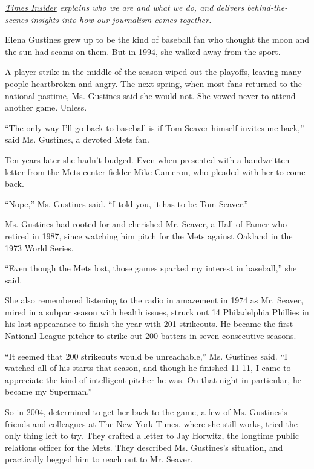 \href{https://www.nytimes3xbfgragh.onion/series/times-insider}{\emph{Times
Insider}} \emph{explains who we are and what we do, and delivers
behind-the-scenes insights into how our journalism comes together.}

Elena Gustines grew up to be the kind of baseball fan who thought the
moon and the sun had seams on them. But in 1994, she walked away from
the sport.

A player strike in the middle of the season wiped out the playoffs,
leaving many people heartbroken and angry. The next spring, when most
fans returned to the national pastime, Ms. Gustines said she would not.
She vowed never to attend another game. Unless.

``The only way I'll go back to baseball is if Tom Seaver himself invites
me back,'' said Ms. Gustines, a devoted Mets fan.

Ten years later she hadn't budged. Even when presented with a
handwritten letter from the Mets center fielder Mike Cameron, who
pleaded with her to come back.

``Nope,'' Ms. Gustines said. ``I told you, it has to be Tom Seaver.''

Ms. Gustines had rooted for and cherished Mr. Seaver, a Hall of Famer
who retired in 1987, since watching him pitch for the Mets against
Oakland in the 1973 World Series.

``Even though the Mets lost, those games sparked my interest in
baseball,'' she said.

She also remembered listening to the radio in amazement in 1974 as Mr.
Seaver, mired in a subpar season with health issues, struck out 14
Philadelphia Phillies in his last appearance to finish the year with 201
strikeouts. He became the first National League pitcher to strike out
200 batters in seven consecutive seasons.

``It seemed that 200 strikeouts would be unreachable,'' Ms. Gustines
said. ``I watched all of his starts that season, and though he finished
11-11, I came to appreciate the kind of intelligent pitcher he was. On
that night in particular, he became my Superman.''

So in 2004, determined to get her back to the game, a few of Ms.
Gustines's friends and colleagues at The New York Times, where she still
works, tried the only thing left to try. They crafted a letter to Jay
Horwitz, the longtime public relations officer for the Mets. They
described Ms. Gustines's situation, and practically begged him to reach
out to Mr. Seaver.

